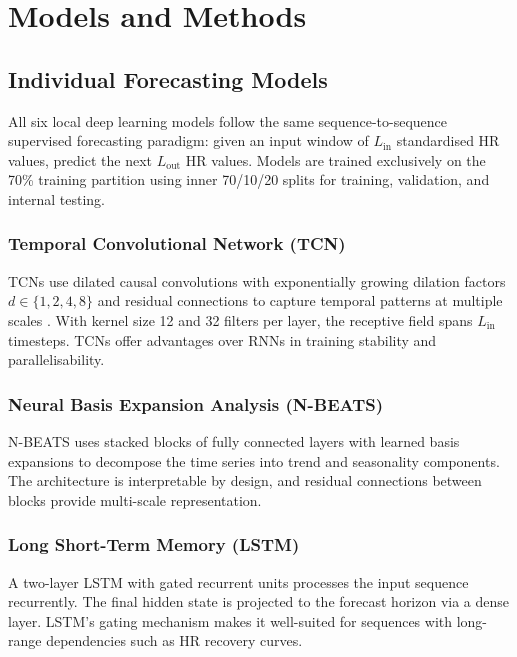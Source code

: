 \documentclass[11pt,a4paper]{article}
\begin{document}
\section{Models and Methods}
\label{sec:models}

\subsection{Individual Forecasting Models}

All six local deep learning models follow the same sequence-to-sequence
supervised forecasting paradigm: given an input window of $L_{\mathrm{in}}$
standardised HR values, predict the next $L_{\mathrm{out}}$ HR values.  Models
are trained exclusively on the 70\% training partition using inner 70/10/20
splits for training, validation, and internal testing.

\subsubsection{Temporal Convolutional Network (TCN)}
TCNs use dilated causal convolutions with exponentially growing dilation
factors $d \in \{1, 2, 4, 8\}$ and residual connections to capture temporal
patterns at multiple scales \cite{bai2018}.  With kernel size 12 and 32
filters per layer, the receptive field spans $L_{\mathrm{in}}$ timesteps.
TCNs offer advantages over RNNs in training stability and parallelisability.

\subsubsection{Neural Basis Expansion Analysis (N-BEATS)}
N-BEATS \cite{oreshkin2020} uses stacked blocks of fully connected layers with
learned basis expansions to decompose the time series into trend and
seasonality components.  The architecture is interpretable by design, and
residual connections between blocks provide multi-scale representation.

\subsubsection{Long Short-Term Memory (LSTM)}
A two-layer LSTM with gated recurrent units processes the input sequence
recurrently.  The final hidden state is projected to the forecast horizon via a
dense layer.  LSTM's gating mechanism makes it well-suited for sequences with
long-range dependencies such as HR recovery curves.
\end{document}
